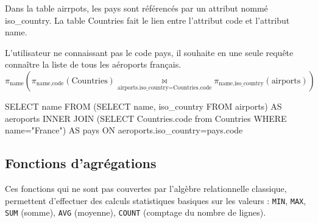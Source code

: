 \documentclass[10pt,fleqn]{article} %
\begin{document}
\begin{exemple}
Dans la table airrpots, les pays sont référencés par un attribut nommé iso\_country. La table Countries fait le lien entre l'attribut code et l'attribut name. 

L'utilisateur ne connaissant pas le code pays, il souhaite en une seule requête connaître la liste de tous les aéroports français. 
\ifprof
$$
\pi_{\text{name}}\left( 
\pi_{\text{name,code}}\left(\text{Countries}  \right)
\underset{\text{airports.iso\_country}=\text{Countries.code}}{\bowtie }
\pi_{\text{name,iso\_country}}\left( \text{airports}  \right)
\right)
$$

\begin{envsql}
\begin{sql}
SELECT name FROM 
    (SELECT name, iso_country FROM airports) AS aeroports
    INNER JOIN 
    (SELECT Countries.code from Countries WHERE name="France") AS pays     
        ON aeroports.iso_country=pays.code
\end{sql}
\end{envsql}
\else
\vspace{6cm}
\fi


\end{exemple}

\subsection{Fonctions d'agrégations}
\begin{defi}
Ces fonctions qui ne sont pas couvertes par l’algèbre relationnelle 
classique, permettent d’effectuer des calculs statistiques basiques sur les valeurs : \texttt{MIN}, \texttt{MAX}, \texttt{SUM} 
(somme), \texttt{AVG} (moyenne), \texttt{COUNT} (comptage du nombre de lignes). 

\end{defi}
\end{document}
